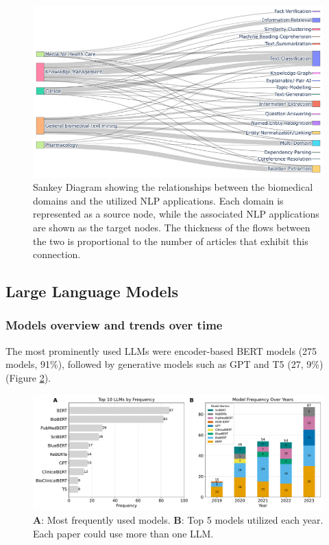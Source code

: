 \documentclass[fleqn,10pt]{olplainarticle}
\begin{document}
\begin{figure}[!ht]
\centering
\includegraphics[scale=0.45]{visuals/new_pdf/sankey_plot_domain_to_nlp.png}
\caption{Sankey Diagram showing the relationships between the biomedical domains and the utilized NLP applications. Each domain is represented as a source node, while the associated NLP applications are shown as the target nodes. The thickness of the flows between the two is proportional to the number of articles that exhibit this connection.}
\label{fig:sankey}
\end{figure}


\subsection*{Large Language Models}

\subsubsection*{Models overview and trends over time}

The most prominently used LLMs were encoder-based BERT models (275 models, 91\%), followed by generative models such as GPT and T5 (27, 9\%) (Figure \ref{fig:llms_overview_and_time_trends}).

\begin{figure}[!ht]
\begin{center}
\includegraphics[scale=0.4]{visuals/new_pdf/LLM_models_and_time_trend_2024.pdf} %
\caption{\textbf{A}: Most frequently used models. \textbf{B}: Top 5 models utilized each year. Each paper could use more than one LLM.}
\label{fig:llms_overview_and_time_trends}
\end{center}
\end{figure}
\end{document}
